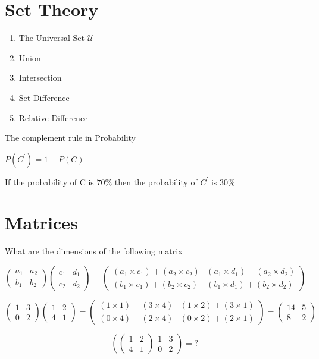 \documentclass{article}
\begin{document}
\section{Set Theory}
\begin{enumerate}
\item The Universal Set $\mathcal{U}$
\item Union
\item Intersection
\item Set Difference
\item Relative Difference
\end{enumerate}




The complement rule in Probability

$P(C^{\prime}) = 1- P(C)$

 

If the probability of C is $70 \%$ then the probability of $C^{\prime}$ is $30\%$
\section{Matrices}

What are the dimensions of the following matrix


\[ \left(
\begin{array}{cc}
a_1 & a_2 \\ 
b_1 & b_2
\end{array} \right)\left(
\begin{array}{cc}
c_1 & d_1 \\ 
c_2 & d_2
\end{array} \right) = \left(
\begin{array}{cc}
(a_1 \times c_1) + (a_2 \times c_2) & (a_1 \times d_1) + (a_2 \times d_2) \\ 
(b_1 \times c_1) + (b_2 \times c_2) & (b_1 \times d_1) + (b_2 \times d_2)
\end{array} \right) \]

\bigskip
\large{
\[ \left(
\begin{array}{cc}
1 & 3 \\ 
0 & 2
\end{array} \right)\left(
\begin{array}{cc}
1 & 2 \\ 
4 & 1
\end{array} \right) = \left(
\begin{array}{cc}
(1 \times 1) + (3 \times 4) & (1 \times 2) + (3 \times 1) \\ 
(0 \times 4) + (2 \times 4) & (0 \times 2) + (2 \times 1)
\end{array} \right) = \left(
\begin{array}{cc}
14 & 5 \\ 
8 & 2
\end{array} \right) \]
}

\[ \left(
\left(
\begin{array}{cc}
1 & 2 \\ 
4 & 1
\end{array} \right)
\begin{array}{cc}
1 & 3 \\ 
0 & 2
\end{array} \right) = ? \]
\end{document}
